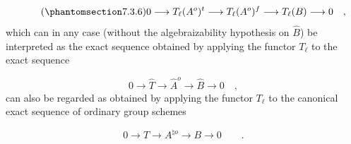\begin{equation}\tag{\SGARefTarget{sga7.sga7i.eix.n7-3-6}{7.3.6}}
0 \longrightarrow T_{\ell}(A^{o})^{t}
 \longrightarrow T_{\ell}(A^{o})^{f}
 \longrightarrow T_{\ell}(B) \longrightarrow 0 \quad ,
\end{equation}
which can in any case (without the algebraizability hypothesis on
$\widehat B$) be interpreted as the exact sequence obtained by
applying the functor $T_{\ell}$ to the exact sequence

\begin{equation*}
0 \longrightarrow \widehat{T} \longrightarrow \widehat{A}^{o}
 \longrightarrow \widehat{B} \longrightarrow 0 \quad ,
\end{equation*}
can also be regarded as obtained by applying the functor $T_{\ell}$
to the canonical exact sequence of ordinary group schemes

\begin{equation*}
0 \longrightarrow T \longrightarrow A^{\natural o}
 \longrightarrow B \longrightarrow 0 \qquad .
\end{equation*}

